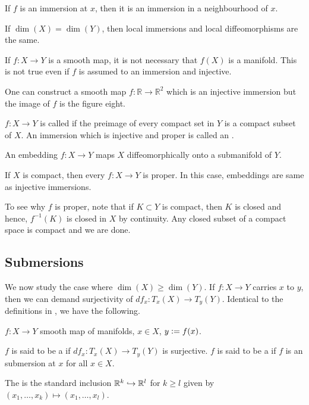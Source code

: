 \begin{cor}
	If $f$ is an immersion at $x$, then it is an immersion in a neighbourhood of $x$.
\end{cor}

\begin{rem}
	If $\dim(X) = \dim(Y)$, then local immersions and local diffeomorphisms are the same.
\end{rem}

\begin{rem} \label{rem:immersion-injective-not-embedding}
	If $f : X \to Y$ is a smooth map, it is not necessary that $f(X)$ is a manifold. This is not true even if $f$ is assumed to an immersion and injective. 

	One can construct a smooth map $f : \mathbb{R} \to \mathbb{R}^{2}$ which is an injective immersion but the image of $f$ is the figure eight.
\end{rem}

\begin{defn}
	$f : X \to Y$ is called  if the preimage of every compact set in $Y$ is a compact subset of $X$. An immersion which is injective and proper is called an .
\end{defn}

\begin{thm}
	An embedding $f : X \to Y$ maps $X$ diffeomorphically onto a submanifold of $Y$.
\end{thm}

\begin{rem} \label{rem:compact-injective-immersion-embedding}
	If $X$ is compact, then every $f : X \to Y$ is proper. In this case, embeddings are same as injective immersions.

	To see why $f$ is proper, note that if $K \subset Y$ is compact, then $K$ is closed and hence, $f^{-1}(K)$ is closed in $X$ by continuity. Any closed subset of a compact space is compact and we are done.
\end{rem}

\subsection{Submersions}

We now study the case where $\dim(X) \ge \dim(Y)$. If $f : X \to Y$ carries $x$ to $y$, then we can demand surjectivity of $df_{x} : T_{x}(X) \to T_{y}(Y)$. Identical to the definitions in , we have the following.

\begin{defn} 
	$f : X \to Y$ smooth map of manifolds, $x \in X$, $y \vcentcolon= f(x)$.

	$f$ is said to be a  if $df_{x} : T_{x}(X) \to T_{y}(Y)$ is surjective. \newline
	$f$ is said to be a  if $f$ is an submersion at $x$ for all $x \in X$. 

	The  is the standard inclusion $\mathbb{R}^{k} \hookrightarrow \mathbb{R}^{l}$ for $k \ge l$ given by $(x_{1}, \ldots, x_{k}) \mapsto (x_{1}, \ldots, x_{l})$.
\end{defn}

